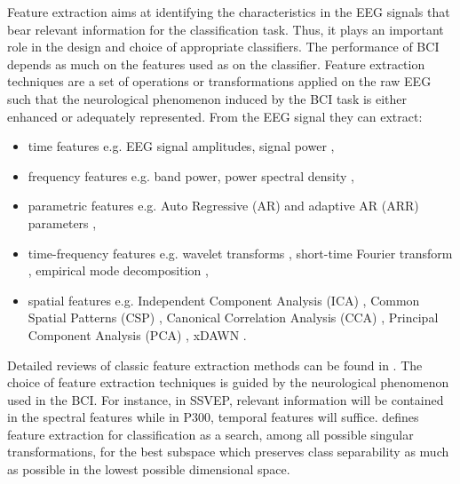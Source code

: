 Feature extraction aims at identifying the characteristics in the EEG signals that bear relevant information for the classification task. 
Thus, it plays an important role in the design and choice of appropriate classifiers. 
The performance of BCI depends as much on the features used as on the classifier.
Feature extraction techniques are a set of operations or transformations applied on the raw EEG such that the neurological phenomenon induced by the BCI task is either enhanced or adequately represented. 
From the EEG signal they can extract:
\begin{itemize}
\item  time features e.g. EEG signal amplitudes, signal power \citep{rivet_xdawn_2009},
\item frequency features e.g. band power, power spectral density \citep{bhattacharyya_performance_2010}, 
\item parametric features e.g. Auto Regressive (AR) and adaptive AR (ARR) parameters \citep{zhang_classification_2015}, 
\item time-frequency features e.g. wavelet transforms \citep{kumar_design_2010, dingyin_feature_2011, zhang_comparison_2015}, short-time Fourier transform \citep{kumar_design_2010}, empirical mode decomposition \citep{gaur_empirical_2015, wang_motor_2011,liu_novel_2011}, 
 \item spatial features e.g. Independent Component Analysis (ICA) \citep{wang_enhancing_2006, wang_improving_2013, brunner_spatial_2007}, Common Spatial Patterns (CSP) \citep{ang_filter_2012, barachant_common_2010, blankertz_optimizing_2008}, Canonical Correlation Analysis (CCA) \citep{nakanishi_high-speed_2014, kalunga_ssvep_2013}, Principal Component Analysis (PCA) \citep{kottaimalai_eeg_2013, yu_analysis_2014}, xDAWN \citep{rivet_xdawn_2009}.
\end{itemize}
Detailed reviews of classic feature extraction methods can be found in \citep{lotte_review_2007, nicolas-alonso_brain_2012, bashashati_survey_2007, khorshidtalab_eeg_2011, krusienski_critical_2011}. 
The choice of feature extraction techniques is guided by the neurological phenomenon used in the BCI.
For instance, in SSVEP, relevant information will be contained in the spectral features while in P300, temporal features will suffice. 
\cite{fukunaga_introduction_1990} defines feature extraction for classification as a search, among all possible singular transformations, for the best subspace which preserves class separability as much as possible in the lowest possible dimensional space.

